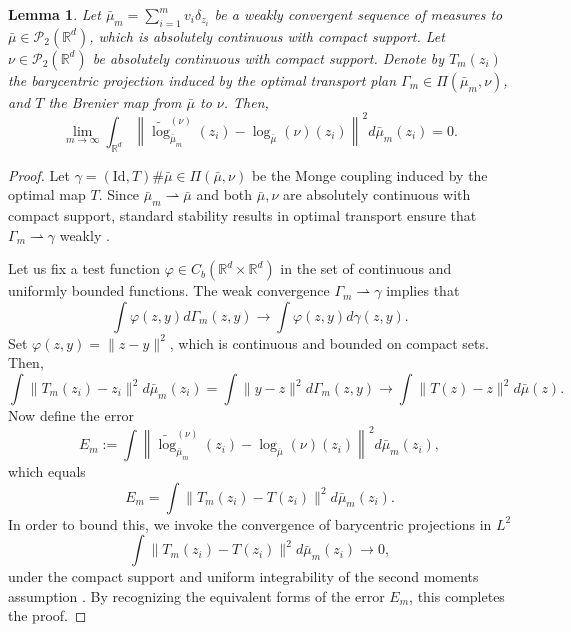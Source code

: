 \documentclass[11pt]{article}
\newtheorem{lemma}[theorem]{Lemma}
\newcommand{\bbR}{\mathbb{R}}
\newcommand{\calP}{\mathcal{P}}
\begin{document}
\begin{lemma}\label{theory:consistency_barycentric_projection}
    Let $\bar{\mu}_m = \sum_{i=1}^m v_i \delta_{z_i}$ be a weakly convergent sequence of measures to $\bar{\mu} \in \calP_2(\bbR^d)$, which is absolutely continuous with compact support. Let $\nu \in \calP_2(\bbR^d)$ be absolutely continuous with compact support. Denote by $T_m(z_i)$ the barycentric projection induced by the optimal transport plan 
    $\Gamma_m \in \Pi(\bar{\mu}_m, \nu)$, and $T$ the Brenier map from $\bar{\mu}$ to $\nu$. Then, 
    \begin{equation*}
        \lim_{m\to\infty} \int_{\bbR^d} \left\|\widetilde{\log}_{\bar{\mu}_m}^{(\nu)}(z_i) - \log_{\bar{\mu}}(\nu)(z_i)\right\|^2 d\bar{\mu}_m(z_i) = 0.
    \end{equation*}
\end{lemma}
\begin{proof}
Let $\gamma = (\text{Id},T)\#\bar{\mu} \in \Pi(\bar{\mu}, \nu)$ be the Monge coupling induced by the optimal map $T$. Since $\bar{\mu}_m \rightharpoonup \bar{\mu}$ and both $\bar{\mu}, \nu$ are absolutely continuous with compact support, standard stability results in optimal transport ensure that $\Gamma_m \rightharpoonup \gamma$ weakly \citep{villani_2003_TopicsOptimalTransportation}.

Let us fix a test function $\varphi \in C_b(\bbR^d\times \bbR^d)$ in the set of continuous and uniformly bounded functions. The weak convergence $\Gamma_m \rightharpoonup \gamma$ implies that 
\begin{equation*}
    \int \varphi(z,y)d\Gamma_m(z,y) \to \int \varphi(z,y) d\gamma(z,y).
\end{equation*}
Set $\varphi(z,y) = \|z-y\|^2$, which is continuous and bounded on compact sets. Then, 
\begin{equation*}
    \int \|T_m(z_i)-z_i\|^2 d\bar{\mu}_m(z_i) = \int \|y-z\|^2 d\Gamma_m(z,y) \to \int \|T(z) -z\|^2 d\bar{\mu}(z).
\end{equation*}
Now define the error
\begin{equation*}
    E_m := \int \left\|\widetilde{\log}_{\bar{\mu}_m}^{(\nu)}(z_i) - \log_{\bar{\mu}}(\nu)(z_i) \right\|^2 d\bar{\mu}_m (z_i),
\end{equation*}
which equals 
\begin{equation*}
    E_m = \int \|T_m(z_i) - T(z_i)\|^2 d\bar{\mu}_m(z_i).
\end{equation*}
In order to bound this, we invoke the convergence of barycentric projections in $L^2$ 
\begin{equation*}
    \int \|T_m(z_i) - T(z_i)\|^2 d\bar{\mu}_m(z_i) \to 0,
\end{equation*}
under the compact support and uniform integrability of the second moments assumption \citep{peyre_2019_ComputationalOptimalTransport}. By recognizing the equivalent forms of the error $E_m$, this completes the proof. 
\end{proof}
\end{document}

